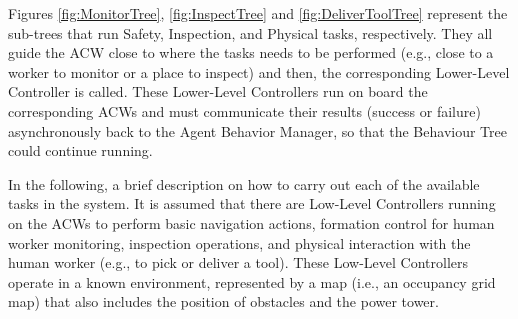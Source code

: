 
Figures \ref{fig:MonitorTree}, \ref{fig:InspectTree} and \ref{fig:DeliverToolTree} represent the sub-trees that run Safety, Inspection, and Physical tasks, respectively. They all guide the \gls{ACW} close to where the tasks needs to be performed (e.g., close to a worker to monitor or a place to inspect) and then, the corresponding Lower-Level Controller is called. These Lower-Level Controllers run on board the corresponding \gls{ACW}s and must communicate their results (success or failure) asynchronously back to the Agent Behavior Manager, so that the Behaviour Tree could continue running.

In the following, a brief description on how to carry out each of the available tasks in the system. It is assumed that there are Low-Level Controllers running on the \glspl{ACW} to perform basic navigation actions, formation control for human worker monitoring, inspection operations, and physical interaction with the human worker (e.g., to pick or deliver a tool). These Low-Level Controllers operate in a known environment, represented by a map (i.e., an occupancy grid map) that also includes the position of obstacles and the power tower.


